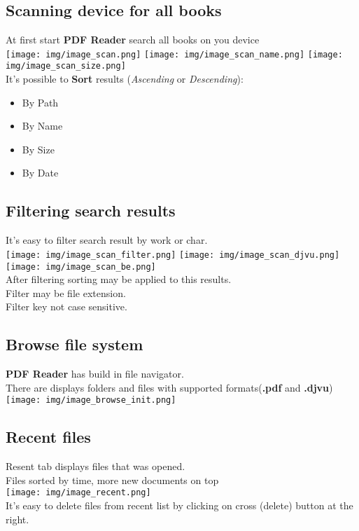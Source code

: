 \documentclass[14pt,letter]{article}
\begin{document}
\subsection{Scanning device for all books}
At first start \textbf{PDF Reader} search all books on you device\\
\texttt{[image: img/image\_scan.png]}
\texttt{[image: img/image\_scan\_name.png]}
\texttt{[image: img/image\_scan\_size.png]}
\\
It's possible to \textbf{Sort}  results (\textit{Ascending} or \textit{Descending}):
\begin{itemize}
  \item By Path
  \item By Name
  \item By Size 
  \item By Date 
\end{itemize}

\subsection{Filtering search results} 
It's easy to filter search result by work or char.\\
\texttt{[image: img/image\_scan\_filter.png]}
\texttt{[image: img/image\_scan\_djvu.png]}
\texttt{[image: img/image\_scan\_be.png]}\\
After filtering sorting may be applied to this results.\\
Filter may be file extension.\\
Filter key not case sensitive.

\newpage
\subsection{Browse file system}
\textbf{PDF Reader} has build in file navigator.\\
There are displays folders and files with supported formats(\textbf{.pdf} and \textbf{.djvu})\\
\texttt{[image: img/image\_browse\_init.png]}

\subsection{Recent files}
Resent tab displays files that was opened.\\
Files sorted by time, more new documents on top\\
\texttt{[image: img/image\_recent.png]} \\
It's easy to delete files from recent list by clicking on cross (delete) button at the right.
\end{document}
